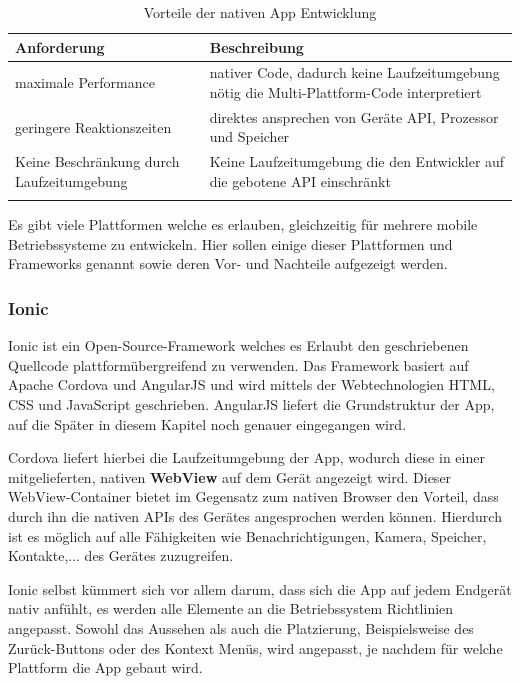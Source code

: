 \begin{table} [H]
	\begin{center}
		\begin{tabular}{p{4cm} p{10cm}}
			\rowcolor{black!20}  \textbf{Anforderung} & \textbf{Beschreibung} \\
			\hline \toprule
			maximale Performance & nativer Code, dadurch keine Laufzeitumgebung nötig die Multi-Plattform-Code interpretiert \\ \hline \addlinespace
			geringere Reaktionszeiten & direktes ansprechen von Geräte API, Prozessor und Speicher \\ \hline \addlinespace
			Keine Beschränkung durch Laufzeitumgebung & Keine Laufzeitumgebung die den Entwickler auf die gebotene API einschränkt \\ \hline \addlinespace
		\end{tabular}
	\end{center}
	\label{VorteileNativ}
	\caption[Vorteile der nativen App Entwicklung]{Vorteile der nativen App Entwicklung}
\end{table}

Es gibt viele Plattformen welche es erlauben, gleichzeitig für mehrere mobile Betriebssysteme zu entwickeln. Hier sollen einige dieser Plattformen und Frameworks genannt sowie deren Vor- und Nachteile aufgezeigt werden.

\subsubsection{Ionic}
Ionic ist ein Open-Source-Framework welches es Erlaubt den geschriebenen Quellcode plattformübergreifend zu verwenden. Das Framework basiert auf Apache Cordova und AngularJS und wird mittels der Webtechnologien HTML, CSS und JavaScript geschrieben. AngularJS liefert die Grundstruktur der App, auf die Später in diesem Kapitel noch genauer eingegangen wird.

Cordova liefert hierbei die Laufzeitumgebung der App, wodurch diese in einer mitgelieferten, nativen \textbf{WebView} auf dem Gerät angezeigt wird. Dieser WebView-Container bietet im Gegensatz zum nativen Browser den Vorteil, dass durch ihn die nativen APIs des Gerätes angesprochen werden können. Hierdurch ist es möglich auf alle Fähigkeiten wie Benachrichtigungen, Kamera, Speicher, Kontakte,... des Gerätes zuzugreifen.

Ionic selbst kümmert sich vor allem darum, dass sich die App auf jedem Endgerät nativ anfühlt, es werden alle Elemente an die Betriebssystem Richtlinien angepasst. Sowohl das Aussehen als auch die Platzierung, Beispielsweise des Zurück-Buttons oder des Kontext Menüs, wird angepasst, je nachdem für welche Plattform die App gebaut wird. 

